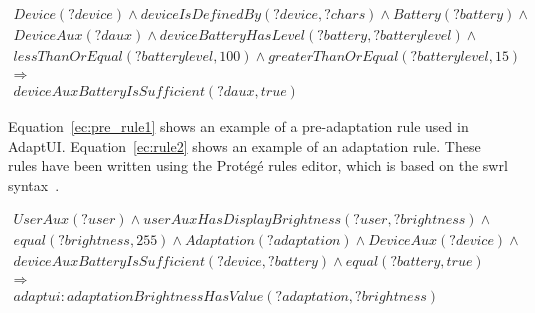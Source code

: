\footnotesize

  \begin{equation} \label{ec:pre_rule1}
  \begin{align*} 
  Device(?device) ∧ deviceIsDefinedBy(?device, ?chars) ∧ Battery(?battery) ∧ \\
  DeviceAux(?daux) ∧ deviceBatteryHasLevel(?battery, ?batterylevel) ∧ \\
  lessThanOrEqual(?batterylevel, 100) ∧ greaterThanOrEqual(?batterylevel, 15) \\
  \Rightarrow \\
  deviceAuxBatteryIsSufficient(?daux, true)
  \end{align*}
  \end{equation}

\normalsize

Equation~\ref{ec:pre_rule1} shows an example of a pre-adaptation rule used in
AdaptUI. Equation~\ref{ec:rule2} shows an example of an adaptation rule. These
rules have been written using the Protégé rules editor, which is based on the
\ac{swrl} syntax~\citep{swrl}.

\footnotesize
  \begin{equation} \label{ec:rule2}
  \begin{align*} 
  UserAux(?user) ∧ userAuxHasDisplayBrightness(?user, ?brightness) ∧ \\ 
  equal(?brightness, 255) ∧ Adaptation(?adaptation) ∧  DeviceAux(?device) ∧ \\
  deviceAuxBatteryIsSufficient(?device, ?battery) ∧  equal(?battery, true) \\
  \Rightarrow \\
  adaptui:adaptationBrightnessHasValue(?adaptation, ?brightness)
  \end{align*}
  \end{equation}
\normalsize

